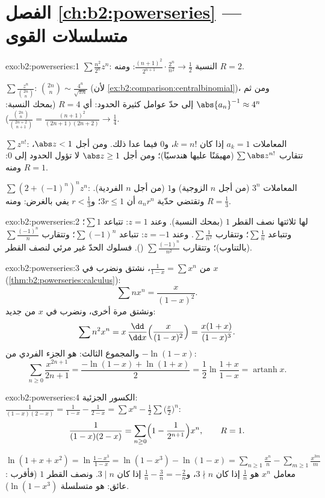 \section*{الفصل \ref{ch:b2:powerseries} --- متسلسلات القوى}

\begin{solution}{exo:b2:powerseries:1}
$\sum \frac{n^2}{2^n}z^n$: النسبة $\frac{(n+1)^2}{2^{n+1}}\cdot
\frac{2^n}{n^2} \to \frac12$: ومنه $R = 2$.

$\sum \frac{z^n}{\binom{2n}{n}}$: $\binom{2n}{n} \sim
\frac{4^n}{\sqrt{\pi n}}$ (لأن \cref{ex:b2:comparison:centralbinomial})،
ومن ثم $\abs{a_n}^{-1} \approx 4^n$ إلى حدّ عوامل كثيرة الحدود: أي $R = 4$
(بمحك النسبة: $\frac{\binom{2n}{n}}{\binom{2n+2}{n+1}} =
\frac{(n+1)^2}{(2n+1)(2n+2)} \to \frac14$).

$\sum z^{n!}$: المعاملات $a_k = 1$ إذا كان $k = n!$، و$0$ فيما عدا ذلك. ومن أجل
$\abs z < 1$، تتقارب $\sum \abs z^{n!}$ (مهيمَنًا عليها هندسيًا)؛
ومن أجل $\abs z \geq 1$ لا تؤول الحدود إلى $0$: ومنه $R = 1$.

$\sum (2 + (-1)^n)^n z^n$: المعاملات $3^n$ (من أجل $n$ الزوجية) و$1$
(من أجل $n$ الفردية). وتقتضي حدّية $a_nr^n$ أن $3r \leq 1$؛ و$r <
\frac13$ يفي بالغرض: ومنه $R = \frac13$.
\end{solution}

\begin{solution}{exo:b2:powerseries:2}
لها ثلاثتها نصف القطر $1$ (بمحك النسبة). وعند $z = 1$: تتباعد $\sum 1$؛
وتتباعد $\sum\frac1n$؛ وتتقارب $\sum\frac{1}{n^2}$. وعند
$z = -1$: تتباعد $\sum(-1)^n$؛ وتتقارب $\sum\frac{(-1)^n}{n}$
(بالتناوب)؛ وتتقارب $\sum\frac{(-1)^n}{n^2}$ ().
فسلوك الحدّ غير مرئي لنصف القطر.
\end{solution}

\begin{solution}{exo:b2:powerseries:3}
من $\frac{1}{1-x} = \sum x^n$، نشتق ونضرب في $x$
(\cref{thm:b2:powerseries:calculus}):
\[
\sum n x^n = \frac{x}{(1-x)^2} .
\]
ونشتق مرة أخرى، ونضرب في $x$ من جديد:
\[
\sum n^2 x^n = x\,\frac{\dd}{\dd x}\Bigl(\frac{x}{(1-x)^2}\Bigr)
= \frac{x(1 + x)}{(1-x)^3} .
\]
والمجموع الثالث: هو الجزء الفردي من $-\ln(1 - x)$:
\[
\sum_{n\geq0} \frac{x^{2n+1}}{2n+1}
= \frac{-\ln(1-x) + \ln(1+x)}{2}
= \frac12 \ln\frac{1+x}{1-x}
= \operatorname{artanh} x .
\]
\end{solution}

\begin{solution}{exo:b2:powerseries:4}
الكسور الجزئية: $\frac{1}{(1-x)(2-x)} = \frac{1}{1-x} -
\frac{1}{2 - x} = \sum x^n - \frac12\sum \bigl(\frac x2\bigr)^n$:
\[
\frac{1}{(1-x)(2-x)} = \sum_{n\geq0} \Bigl(1 -
\frac{1}{2^{n+1}}\Bigr)x^n,
\qquad R = 1 .
\]

$\ln(1 + x + x^2) = \ln\frac{1 - x^3}{1 - x} = \ln(1 - x^3) -
\ln(1 - x) = \sum_{n\geq1}\frac{x^n}{n} -
\sum_{m\geq1}\frac{x^{3m}}{m}$: معامل $x^n$ هو
$\frac1n$ إذا كان $3 \nmid n$، و$\frac1n - \frac{3}{n} = -\frac2n$ إذا كان
$3 \mid n$. ونصف القطر $1$ (فأقرب عائق: هو متسلسلة
$\ln(1-x^3)$).
\end{solution}

